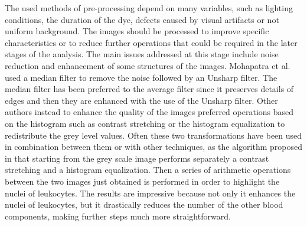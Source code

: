 \documentclass[final,a4paper,12pt,english]{UnicaPhdThesis3}
\begin{document}
The used methods of pre-processing depend on many variables, such as lighting conditions, the duration of the dye, defects caused by visual artifacts or not uniform background. The images should be processed to improve specific characteristics or to reduce further operations that could be required in the later stages of the analysis. The main issues addressed at this stage include noise reduction and enhancement of some structures of the images. Mohapatra et al. \cite{Mohapatra10a, Mohapatra10b, Mohapatra10c, Mohapatra14} used a median filter to remove the noise followed by an Unsharp filter. The median filter has been preferred to the average filter since it preserves details of edges and then they are enhanced with the use of the Unsharp filter. Other authors instead to enhance the quality of the images preferred operations based on the histogram such as contrast stretching or the histogram equalization to redistribute the grey level values. Often these two transformations have been used in combination between them or with other techniques, as the algorithm proposed in \cite{Madhloom} that starting from the grey scale image performs separately a contrast stretching and a histogram equalization. Then a series of arithmetic operations between the two images just obtained is performed in order to highlight the nuclei of leukocytes. The results are impressive because not only it
enhances the nuclei of leukocytes, but it drastically reduces the number of the other blood components, making further steps much more straightforward.
\end{document}
